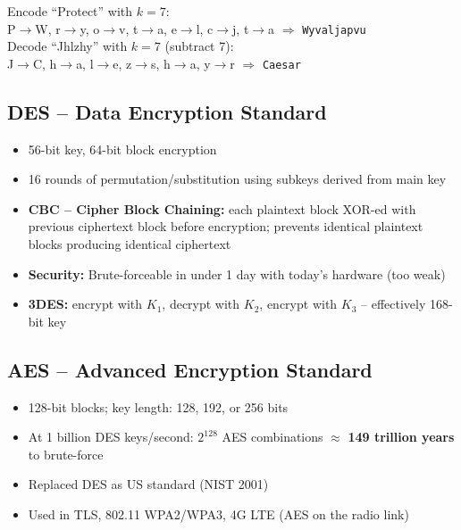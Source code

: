 \begin{tcolorbox}[formulabox, title=Caesar Cipher Example -- k=7]
Encode ``Protect'' with $k=7$:\\
P$\to$W, r$\to$y, o$\to$v, t$\to$a, e$\to$l, c$\to$j, t$\to$a $\Rightarrow$ \texttt{Wyvaljapvu}\\[4pt]
Decode ``Jhlzhy'' with $k=7$ (subtract 7):\\
J$\to$C, h$\to$a, l$\to$e, z$\to$s, h$\to$a, y$\to$r $\Rightarrow$ \texttt{Caesar}
\end{tcolorbox}

\subsection{DES -- Data Encryption Standard}

\begin{tcolorbox}[keybox, title=DES]
\begin{itemize}[noitemsep]
  \item 56-bit key, 64-bit block encryption
  \item 16 rounds of permutation/substitution using subkeys derived from main key
  \item \textbf{CBC -- Cipher Block Chaining:} each plaintext block XOR-ed with previous ciphertext block before encryption; prevents identical plaintext blocks producing identical ciphertext
  \item \textbf{Security:} Brute-forceable in under 1 day with today's hardware (too weak)
  \item \textbf{3DES:} encrypt with $K_1$, decrypt with $K_2$, encrypt with $K_3$ -- effectively 168-bit key
\end{itemize}
\end{tcolorbox}

\subsection{AES -- Advanced Encryption Standard}

\begin{tcolorbox}[keybox, title=AES]
\begin{itemize}[noitemsep]
  \item 128-bit blocks; key length: 128, 192, or 256 bits
  \item At 1 billion DES keys/second: $2^{128}$ AES combinations $\approx$ \textbf{149 trillion years} to brute-force
  \item Replaced DES as US standard (NIST 2001)
  \item Used in TLS, 802.11 WPA2/WPA3, 4G LTE (AES on the radio link)
\end{itemize}
\end{tcolorbox}

